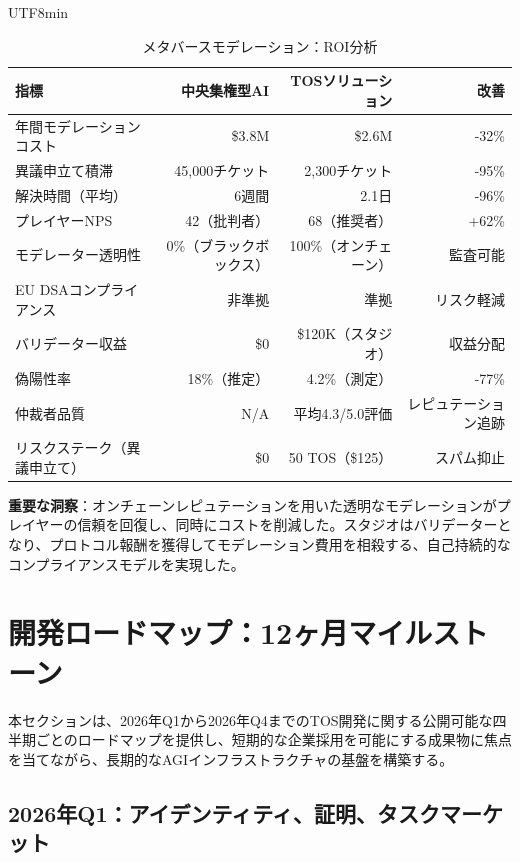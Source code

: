 \documentclass[11pt]{article}
\begin{document}
\begin{CJK}{UTF8}{min}
\begin{itemize}[noitemsep]
\begin{table}[H]
\centering
\caption{メタバースモデレーション：ROI分析}
\label{tab:metaverse-roi}
\begin{tabular}{@{}lrrr@{}}
\toprule
\textbf{指標} & \textbf{中央集権型AI} & \textbf{TOSソリューション} & \textbf{改善} \\ \midrule
年間モデレーションコスト & \$3.8M & \$2.6M & -32\% \\
異議申立て積滞 & 45,000チケット & 2,300チケット & -95\% \\
解決時間（平均） & 6週間 & 2.1日 & -96\% \\
プレイヤーNPS & 42（批判者） & 68（推奨者） & +62\% \\
モデレーター透明性 & 0\%（ブラックボックス） & 100\%（オンチェーン） & 監査可能 \\
EU DSAコンプライアンス & 非準拠 & 準拠 & リスク軽減 \\
バリデーター収益 & \$0 & \$120K（スタジオ） & 収益分配 \\
偽陽性率 & 18\%（推定） & 4.2\%（測定） & -77\% \\
仲裁者品質 & N/A & 平均4.3/5.0評価 & レピュテーション追跡 \\
リスクステーク（異議申立て） & \$0 & 50 TOS（\$125） & スパム抑止 \\
\bottomrule
\end{tabular}
\end{table}

\textbf{重要な洞察}：オンチェーンレピュテーションを用いた透明なモデレーションがプレイヤーの信頼を回復し、同時にコストを削減した。スタジオはバリデーターとなり、プロトコル報酬を獲得してモデレーション費用を相殺する、自己持続的なコンプライアンスモデルを実現した。

\section{開発ロードマップ：12ヶ月マイルストーン}
\label{sec:12month-roadmap}

本セクションは、2026年Q1から2026年Q4までのTOS開発に関する公開可能な四半期ごとのロードマップを提供し、短期的な企業採用を可能にする成果物に焦点を当てながら、長期的なAGIインフラストラクチャの基盤を構築する。

\subsection{2026年Q1：アイデンティティ、証明、タスクマーケット}


\end{itemize}
\end{CJK}
\end{document}
